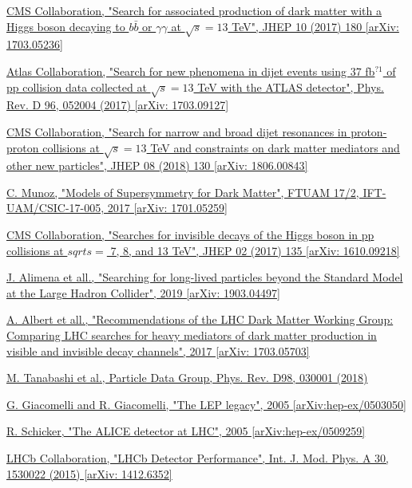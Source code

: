 \documentclass[a4paper, 10pt, openright]{report}
\begin{document}
\begin{thebibliography}{1}
\href{https://arxiv.org/abs/1703.05236}{CMS Collaboration,
"Search for associated production of dark matter with a Higgs boson decaying to $b \bar b$ or $\gamma \gamma$ at $\sqrt{s} = 13$ TeV",
JHEP 10 (2017) 180 [arXiv: 1703.05236]
}

\href{https://arxiv.org/abs/1703.09127}{Atlas Collaboration,
"Search for new phenomena in dijet events using 37 fb$^{?1}$ of pp collision data collected at $\sqrt{s} = 13$ TeV with the ATLAS detector",
Phys. Rev. D 96, 052004 (2017) [arXiv: 1703.09127]
}

\href{https://arxiv.org/abs/1806.00843}{CMS Collaboration,
"Search for narrow and broad dijet resonances in proton-proton collisions at $\sqrt{s} = 13$ TeV and constraints on dark matter mediators and other new particles",
JHEP 08 (2018) 130 [arXiv: 1806.00843]
}

\href{https://arxiv.org/abs/1701.05259}{C. Munoz,
"Models of Supersymmetry for Dark Matter",
FTUAM 17/2, IFT-UAM/CSIC-17-005, 2017 [arXiv: 1701.05259]
}

\href{https://arxiv.org/abs/1610.09218}{CMS Collaboration,
"Searches for invisible decays of the Higgs boson in pp collisions at $sqrt{s} =$ 7, 8, and 13 TeV",
JHEP 02 (2017) 135 [arXiv: 1610.09218]
}

\href{https://arxiv.org/abs/1903.04497?}{J. Alimena et all.,
"Searching for long-lived particles beyond the Standard Model at the Large Hadron Collider",
2019 [arXiv: 1903.04497]
}

\href{https://arxiv.org/abs/1703.05703}{A. Albert et all.,
"Recommendations of the LHC Dark Matter Working Group: Comparing LHC searches for heavy mediators of dark matter production in visible and invisible decay channels",
2017 [arXiv: 1703.05703]
}

\href{http://pdg.lbl.gov/}{M. Tanabashi et al.,
Particle Data Group,
Phys. Rev. D98, 030001 (2018)}

\href{https://arxiv.org/abs/hep-ex/0503050}{G. Giacomelli and R. Giacomelli,
"The LEP legacy", 
2005 [arXiv:hep-ex/0503050]}

\href{https://arxiv.org/abs/hep-ph/0509259}{R. Schicker,
"The ALICE detector at LHC",
2005 [arXiv:hep-ex/0509259]
}

\href{https://arxiv.org/abs/1412.6352}{LHCb Collaboration,
"LHCb Detector Performance",
Int. J. Mod. Phys. A 30, 1530022 (2015) [arXiv: 1412.6352]
}


\end{thebibliography}
\end{document}
